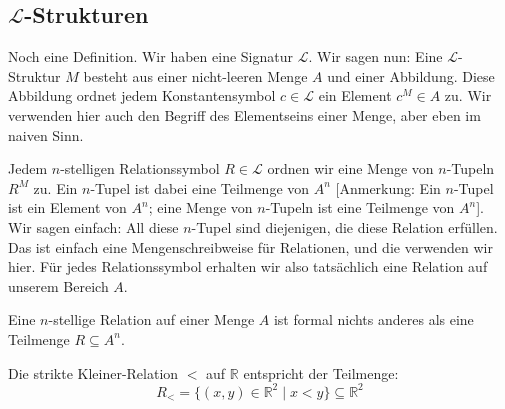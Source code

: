 \subsection{\texorpdfstring{$\mathcal{L}$}{L}-Strukturen}

\begin{spoken-clean}[00:39:40 - 00:41:30]
Noch eine Definition. Wir haben eine Signatur $\mathcal{L}$. Wir sagen nun: Eine $\mathcal{L}$-Struktur $M$ besteht aus einer nicht-leeren Menge $A$ und einer Abbildung. Diese Abbildung ordnet jedem Konstantensymbol $c \in \mathcal{L}$ ein Element $c^M \in A$ zu. Wir verwenden hier auch den Begriff des Elementseins einer Menge, aber eben im naiven Sinn.

Jedem $n$-stelligen Relationssymbol $R \in \mathcal{L}$ ordnen wir eine Menge von $n$-Tupeln $R^M$ zu. Ein $n$-Tupel ist dabei eine Teilmenge von $A^n$ [Anmerkung: Ein $n$-Tupel ist ein Element von $A^n$; eine Menge von $n$-Tupeln ist eine Teilmenge von $A^n$]. Wir sagen einfach: All diese $n$-Tupel sind diejenigen, die diese Relation erfüllen. Das ist einfach eine Mengenschreibweise für Relationen, und die verwenden wir hier. Für jedes Relationssymbol erhalten wir also tatsächlich eine Relation auf unserem Bereich $A$.
\end{spoken-clean}

\begin{math-stroke}

\begin{remark}
Eine $n$-stellige Relation auf einer Menge $A$ ist formal nichts anderes als eine Teilmenge $R \subseteq A^n$.
\begin{example}
Die strikte Kleiner-Relation $<$ auf $\mathbb{R}$ entspricht der Teilmenge:
\[ R_< = \{ (x, y) \in \mathbb{R}^2 \mid x < y \} \subseteq \mathbb{R}^2 \]
\end{example}
\end{remark}
\end{math-stroke}

